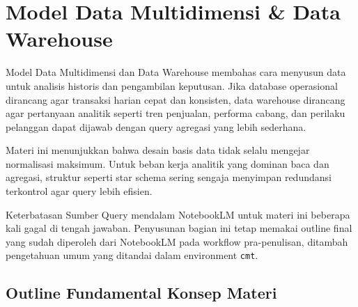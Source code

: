 \section{Model Data Multidimensi \& Data Warehouse}

Model Data Multidimensi dan Data Warehouse membahas cara menyusun data untuk analisis historis dan pengambilan keputusan. Jika database operasional dirancang agar transaksi harian cepat dan konsisten, data warehouse dirancang agar pertanyaan analitik seperti tren penjualan, performa cabang, dan perilaku pelanggan dapat dijawab dengan query agregasi yang lebih sederhana.

Materi ini menunjukkan bahwa desain basis data tidak selalu mengejar normalisasi maksimum. Untuk beban kerja analitik yang dominan baca dan agregasi, struktur seperti star schema sering sengaja menyimpan redundansi terkontrol agar query lebih efisien.

\begin{cmt}{Keterbatasan Sumber}{}
Query mendalam NotebookLM untuk materi ini beberapa kali gagal di tengah jawaban. Penyusunan bagian ini tetap memakai outline final yang sudah diperoleh dari NotebookLM pada workflow pra-penulisan, ditambah pengetahuan umum yang ditandai dalam environment \texttt{cmt}.
\end{cmt}

\subsection{Outline Fundamental Konsep Materi}

